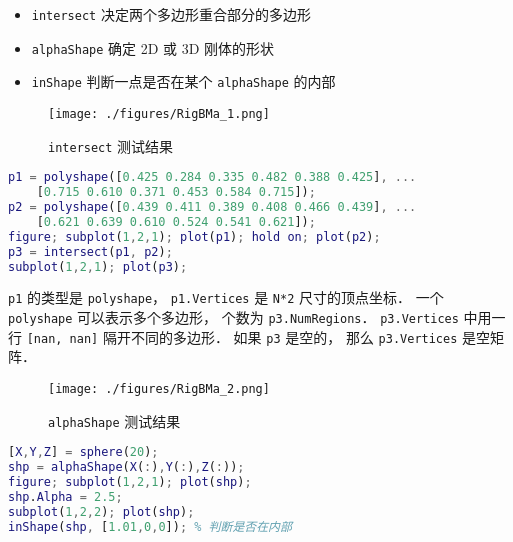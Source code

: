
\begin{issues}
\issueDraft
\end{issues}

\begin{itemize}
\item \verb|intersect| 决定两个多边形重合部分的多边形
\item \verb|alphaShape| 确定 2D 或 3D 刚体的形状
\item \verb|inShape| 判断一点是否在某个 \verb|alphaShape| 的内部
\end{itemize}

\begin{figure}[ht]
\centering
\texttt{[image: ./figures/RigBMa\_1.png]}
\caption{\lstinline|intersect| 测试结果} \label{RigBMa_fig1}
\end{figure}

\begin{lstlisting}[language=matlab]
p1 = polyshape([0.425 0.284 0.335 0.482 0.388 0.425], ...
    [0.715 0.610 0.371 0.453 0.584 0.715]);
p2 = polyshape([0.439 0.411 0.389 0.408 0.466 0.439], ...
    [0.621 0.639 0.610 0.524 0.541 0.621]);
figure; subplot(1,2,1); plot(p1); hold on; plot(p2);
p3 = intersect(p1, p2);
subplot(1,2,1); plot(p3);
\end{lstlisting}
\verb|p1| 的类型是 \verb|polyshape|， \verb|p1.Vertices| 是 \verb|N*2| 尺寸的顶点坐标． 一个 \verb|polyshape| 可以表示多个多边形， 个数为 \verb|p3.NumRegions|． \verb|p3.Vertices| 中用一行 \verb|[nan, nan]| 隔开不同的多边形． 如果 \verb|p3| 是空的， 那么 \verb|p3.Vertices| 是空矩阵．


\begin{figure}[ht]
\centering
\texttt{[image: ./figures/RigBMa\_2.png]}
\caption{\lstinline|alphaShape| 测试结果} \label{RigBMa_fig2}
\end{figure}

\begin{lstlisting}[language=matlab]
[X,Y,Z] = sphere(20);
shp = alphaShape(X(:),Y(:),Z(:));
figure; subplot(1,2,1); plot(shp);
shp.Alpha = 2.5;
subplot(1,2,2); plot(shp);
inShape(shp, [1.01,0,0]); % 判断是否在内部
\end{lstlisting}
